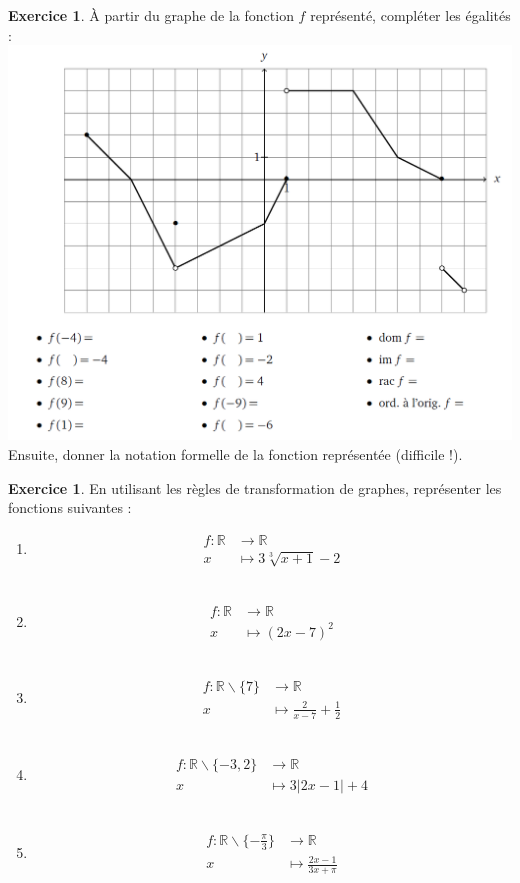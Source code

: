 \documentclass[a4paper,13pt]{scrreprt}
\theoremstyle{plain}
\theoremstyle{definition}
\newtheorem{exo}[subsection]{Exercice}
\newcommand{\rr}{\mathbb{R}}
\begin{document}
\newpage
\begin{exo} \label{exof10b}
	À partir du graphe de la fonction $f$ représenté, compléter les égalités : \\
		\includegraphics[scale=0.6]{qF.PNG} 
		Ensuite, donner la notation formelle de la fonction représentée (difficile !).
\end{exo}
\newpage
\begin{exo} \label{exof10c}
	En utilisant les règles de transformation de graphes, représenter les fonctions suivantes : \\
	\begin{enumerate}
		\item \begin{align*}
		f : {\rr} &\to \rr \\
		x &\mapsto 3\sqrt[3]{x+1}-2
		\end{align*} \\
		\item \begin{align*}
		f : {\rr} &\to \rr \\
		x &\mapsto (2x-7)^2
		\end{align*} \\
		\item \begin{align*}
		f : {\rr} \backslash \{7\} &\to \rr \\
		x &\mapsto \frac{2}{x-7}+\frac{1}{2}
		\end{align*} \\
		\item \begin{align*}
		f : {\rr} \backslash \{-3,2\} &\to \rr \\
		x &\mapsto 3|2x-1|+4
		\end{align*} \\
		\item \begin{align*}
		f : {\rr} \backslash \{-\frac{\pi}{3}\} &\to \rr \\
		x &\mapsto \frac{2x-1}{3x+\pi}
		\end{align*}
	
	\end{enumerate}
\end{exo}
\end{document}
